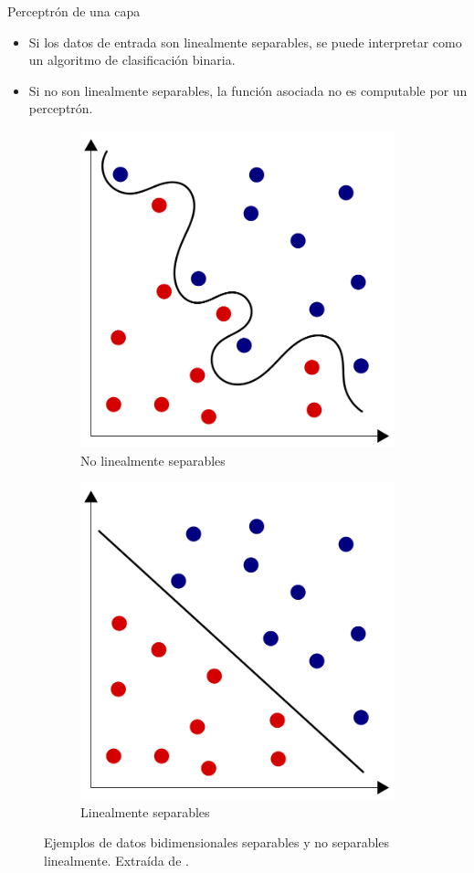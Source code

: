 \documentclass[spanish]{beamer}
\begin{document}
\begin{frame}{Perceptrón de una capa}
  \begin{itemize}
    \item Si los datos de entrada son linealmente separables, se puede interpretar como un algoritmo de clasificación binaria.
    \item Si no son linealmente separables, la función asociada no es computable por un perceptrón.
  \end{itemize}
  \vspace{1em}

\begin{figure}[h]
  \centering
  \begin{subfigure}[b]{0.4\textwidth}
    \centering
    \includegraphics[width=.6\textwidth]{img/non-separable}
    \caption{No linealmente separables}
  \end{subfigure}
  \qquad
  \begin{subfigure}[b]{0.4\textwidth}
    \centering
    \includegraphics[width=.6\textwidth]{img/separable}
    \caption{Linealmente separables}
  \end{subfigure}
  \caption{Ejemplos de datos bidimensionales separables y no separables linealmente. Extraída de \parencite{wikipedia_separable}.}
  \label{fig:separable}
\end{figure}
\end{frame}
\end{document}
